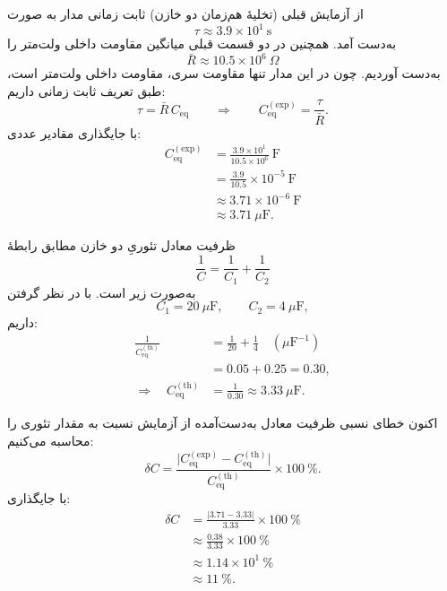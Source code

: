 \documentclass[a4paper, 11pt]{article}
\begin{document}
از آزمایش قبلی (تخلیهٔ هم‌زمان دو خازن) ثابت زمانی مدار به صورت
\[
\tau \approx 3.9\times 10^{1}~\mathrm{s}
\]
به‌دست آمد. همچنین در دو قسمت قبلی میانگین مقاومت داخلی ولت‌متر را
\[
\bar{R} \approx 10.5\times 10^{6}~\Omega
\]
به‌دست آوردیم. چون در این مدار تنها مقاومت سری، مقاومت داخلی ولت‌متر است، طبق تعریف ثابت زمانی داریم:
\begin{equation}
\tau = \bar{R}\,C_{\mathrm{eq}} \qquad\Rightarrow\qquad
C_{\mathrm{eq}}^{(\mathrm{exp})} = \frac{\tau}{\bar{R}}.
\end{equation}
با جایگذاری مقادیر عددی:
\begin{align}
C_{\mathrm{eq}}^{(\mathrm{exp})}
&= \frac{3.9\times 10^{1}}{10.5\times 10^{6}}~\mathrm{F} \\[1mm]
&= \frac{3.9}{10.5}\times 10^{-5}~\mathrm{F} \\[1mm]
&\approx 3.71\times 10^{-6}~\mathrm{F} \\[1mm]
&\approx 3.71~\mu\mathrm{F}.
\end{align}

ظرفیت معادل تئوریِ دو خازن مطابق رابطهٔ
\begin{equation}
\frac{1}{C} = \frac{1}{C_1} + \frac{1}{C_2}
\end{equation}
به‌صورت زیر است. با در نظر گرفتن
\[
C_1 = 20~\mu\mathrm{F}, \qquad C_2 = 4~\mu\mathrm{F},
\]
داریم:
\begin{align}
\frac{1}{C_{\mathrm{eq}}^{(\mathrm{th})}}
&= \frac{1}{20} + \frac{1}{4} \quad (\mu\mathrm{F}^{-1}) \\[1mm]
&= 0.05 + 0.25 = 0.30, \\[1mm]
\Rightarrow\quad
C_{\mathrm{eq}}^{(\mathrm{th})}
&= \frac{1}{0.30} \approx 3.33~\mu\mathrm{F}.
\end{align}

اکنون خطای نسبی ظرفیت معادل به‌دست‌آمده از آزمایش نسبت به مقدار تئوری را محاسبه می‌کنیم:
\begin{equation}
\delta C = \frac{\bigl|C_{\mathrm{eq}}^{(\mathrm{exp})}
             - C_{\mathrm{eq}}^{(\mathrm{th})}\bigr|}
            {C_{\mathrm{eq}}^{(\mathrm{th})}} \times 100~\%.
\end{equation}
با جایگذاری:
\begin{align}
\delta C
&= \frac{|3.71 - 3.33|}{3.33}\times 100~\% \\[1mm]
&\approx \frac{0.38}{3.33}\times 100~\% \\[1mm]
&\approx 1.14\times 10^{1}~\% \\[1mm]
&\approx 11~\%.
\end{align}
\end{document}
